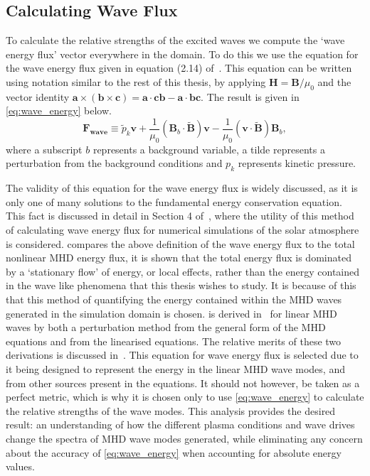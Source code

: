 \documentclass[a4paper,12pt,fourier,authoryear,custommargin]{Classes/PhDThesisPSnPDF}
\renewcommand{\vec}{\mathbf}
\begin{document}
\subsection{Calculating Wave Flux}\label{sec:waveflux}

To calculate the relative strengths of the excited waves we compute the `wave energy flux' vector everywhere in the domain.
To do this we use the equation for the wave energy flux given in equation (2.14) of~\cite{leroy1985}.
This equation can be written using notation similar to the rest of this thesis, by applying $\vec{H} = \vec{B}/\mu_0$ and the vector identity $\vec{a} \times (\vec{b} \times \vec{c}) = \vec{a} \cdot \vec{c}\vec{b} - \vec{a} \cdot \vec{b}\vec{c}$.
The result is given in \cref{eq:wave_energy} below.
\begin{equation}
\vec{F}_{\textbf{wave}} \equiv \widetilde{p}_k \vec{v} + \frac{1}{\mu_0} \left(\vec{B}_b \cdot \vec{\widetilde{B}}\right) \vec{v} - \frac{1}{\mu_0}\left(\vec{v} \cdot \vec{\widetilde{B}} \right) \vec{B}_b,
\label{eq:wave_energy}
\end{equation}
where a subscript $b$ represents a background variable, a tilde represents a perturbation from the background conditions and $p_k$ represents kinetic pressure.

The validity of this equation for the wave energy flux is widely discussed, as it is only one of many solutions to the fundamental energy conservation equation.
This fact is discussed in detail in Section 4 of~\cite{bogdan2003}, where the utility of this method of calculating wave energy flux for numerical simulations of the solar atmosphere is considered.
\cite{bogdan2003} compares the above definition of the wave energy flux to the total nonlinear MHD energy flux, it is shown that the total energy flux is dominated by a `stationary flow' of energy, or local effects, rather than the energy contained in the wave like phenomena that this thesis wishes to study.
It is because of this that this method of quantifying the energy contained within the MHD waves generated in the simulation domain is chosen.
 is derived in~\cite{leroy1985} for linear MHD waves by both a perturbation method from the general form of the MHD equations and from the linearised equations.
The relative merits of these two derivations is discussed in~\cite{leroy1985}.
This equation for wave energy flux is selected due to it being designed to represent the energy in the linear MHD wave modes, and from other sources present in the equations.
It should not however, be taken as a perfect metric, which is why it is chosen only to use \cref{eq:wave_energy} to calculate the relative strengths of the wave modes.
This analysis provides the desired result: an understanding of how the different plasma conditions and wave drives change the spectra of MHD wave modes generated, while eliminating any concern about the accuracy of \cref{eq:wave_energy} when accounting for absolute energy values.
\end{document}
